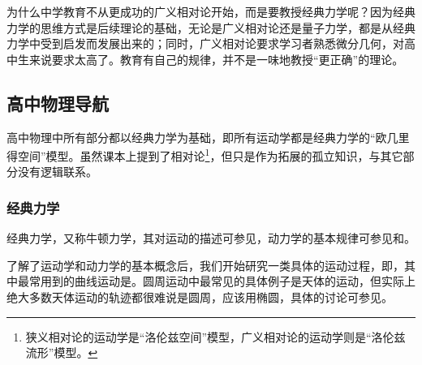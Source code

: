 为什么中学教育不从更成功的广义相对论开始，而是要教授经典力学呢？因为经典力学的思维方式是后续理论的基础，无论是广义相对论还是量子力学，都是从经典力学中受到启发而发展出来的；同时，广义相对论要求学习者熟悉微分几何，对高中生来说要求太高了。教育有自己的规律，并不是一味地教授“更正确”的理论。





\subsection{高中物理导航}


高中物理中所有部分都以经典力学为基础，即所有运动学都是经典力学的“欧几里得空间”模型。虽然课本上提到了相对论\footnote{狭义相对论的运动学是“洛伦兹空间”模型，广义相对论的运动学则是“洛伦兹流形”模型。}，但只是作为拓展的孤立知识，与其它部分没有逻辑联系。




\subsubsection{经典力学}

经典力学，又称牛顿力学，其对运动的描述可参见，动力学的基本规律可参见和。

了解了运动学和动力学的基本概念后，我们开始研究一类具体的运动过程，即，其中最常用到的曲线运动是。圆周运动中最常见的具体例子是天体的运动，但实际上绝大多数天体运动的轨迹都很难说是圆周，应该用椭圆，具体的讨论可参见。



























